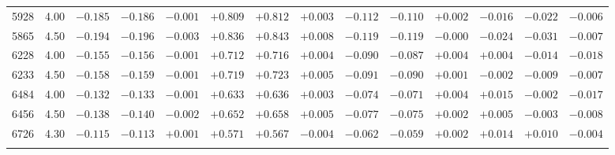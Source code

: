 \documentclass[]{aa}
\begin{document}
\begin{appendix}
\begin{table*}
\begin{center}
\begin{tabular}{llllllllllllll}
5928  &4.00 & $-0.185$ &$ -0.186$ &$ -0.001$ &$ +0.809$ &$ +0.812$ &$ +0.003$ &$ -0.112$ &$ -0.110$  &$+0.002$ &$ -0.016$ &$ -0.022$&$  -0.006$ \\
5865  &4.50 & $-0.194$ &$ -0.196$ &$ -0.003$ &$ +0.836$ &$ +0.843$ &$ +0.008$ &$ -0.119$ &$ -0.119$  &$-0.000$ &$ -0.024$ &$ -0.031$&$  -0.007$ \\
6228  &4.00 & $-0.155$ &$ -0.156$ &$ -0.001$ &$ +0.712$ &$ +0.716$ &$ +0.004$ &$ -0.090$ &$ -0.087$  &$+0.004$ &$ +0.004$ &$ -0.014$&$  -0.018$ \\
6233  &4.50 & $-0.158$ &$ -0.159$ &$ -0.001$ &$ +0.719$ &$ +0.723$ &$ +0.005$ &$ -0.091$ &$ -0.090$  &$+0.001$ &$ -0.002$ &$ -0.009$&$  -0.007$ \\
6484  &4.00 & $-0.132$ &$ -0.133$ &$ -0.001$ &$ +0.633$ &$ +0.636$ &$ +0.003$ &$ -0.074$ &$ -0.071$  &$+0.004$ &$ +0.015$ &$ -0.002$&$  -0.017$ \\
6456  &4.50 & $-0.138$ &$ -0.140$ &$ -0.002$ &$ +0.652$ &$ +0.658$ &$ +0.005$ &$ -0.077$ &$ -0.075$  &$+0.002$ &$ +0.005$ &$ -0.003$&$  -0.008$ \\
6726  &4.30 & $-0.115$ &$ -0.113$ &$ +0.001$ &$ +0.571$ &$ +0.567$ &$ -0.004$ &$ -0.062$ &$ -0.059$  &$+0.002$ &$ +0.014$ &$ +0.010$&$  -0.004$ \\
\hline\noalign{\smallskip}
\hline\noalign{\smallskip}
\end{tabular}
\end{center}
\end{table*}


\end{appendix}
\end{document}

